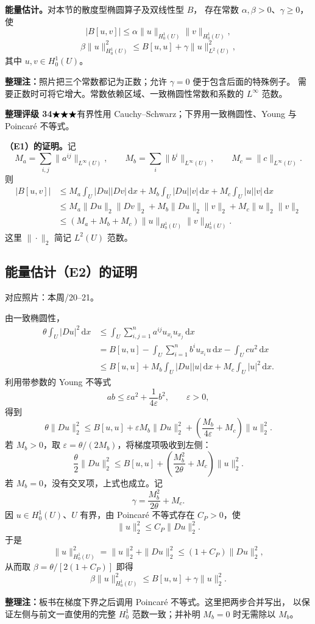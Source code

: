 \documentclass[UTF8,a4paper,11pt,fontset=fandol]{ctexart}
\newcommand{\dd}{\,\mathrm d}
\newcommand{\ednote}[1]{\par{\small\color{notegray}\textbf{整理注：}#1}\par}
\newcommand{\source}[1]{{\small\color{notegray}对应照片：#1。}\par}
\newcommand{\proofstars}[1]{\ensuremath{%
\ifnum#1>0\relax\bigstar\fi
\ifnum#1>1\relax\bigstar\fi
\ifnum#1>2\relax\bigstar\fi
\ifnum#1>3\relax\bigstar\fi
\ifnum#1>4\relax\bigstar\fi}}
\newcommand{\proofrating}[3]{\par{\small\color{proofblue}%
\textbf{整理评级 #1}\enspace\proofstars{#2}\quad #3\par}}
\begin{document}
\textbf{能量估计。}对本节的散度型椭圆算子及双线性型 $B$，
存在常数 $\alpha,\beta>0$、$\gamma\geq0$，使
\[
\boxed{|B[u,v]|\leq\alpha\|u\|_{H_0^1(U)}\|v\|_{H_0^1(U)},}
\tag{E1}
\]
\[
\boxed{\beta\|u\|_{H_0^1(U)}^2
\leq B[u,u]+\gamma\|u\|_{L^2(U)}^2,}
\tag{E2}
\]
其中 $u,v\in H_0^1(U)$。
\ednote{照片把三个常数都记为正数；允许 $\gamma=0$ 便于包含后面的特殊例子。
需要正数时可将它增大。常数依赖区域、一致椭圆性常数和系数的 $L^\infty$ 范数。}

\proofrating{34}{3}{有界性用 Cauchy--Schwarz；下界用一致椭圆性、Young 与 Poincaré 不等式。}
\textbf{（E1）的证明。}记
\[
M_a=\sum_{i,j}\|a^{ij}\|_{L^\infty(U)},\qquad
M_b=\sum_i\|b^i\|_{L^\infty(U)},\qquad
M_c=\|c\|_{L^\infty(U)}.
\]
则
\[
\begin{aligned}
|B[u,v]|&\leq M_a\int_U|Du||Dv|\dd x
 +M_b\int_U|Du||v|\dd x+M_c\int_U|u||v|\dd x\\
&\leq M_a\|Du\|_2\|Dv\|_2
 +M_b\|Du\|_2\|v\|_2+M_c\|u\|_2\|v\|_2\\
&\leq(M_a+M_b+M_c)\|u\|_{H_0^1(U)}\|v\|_{H_0^1(U)}.
\end{aligned}
\]
这里 $\|\cdot\|_2$ 简记 $L^2(U)$ 范数。

\newpage
\subsection*{能量估计（E2）的证明}
\source{本周/20--21}
由一致椭圆性，
\[
\begin{aligned}
\theta\int_U|Du|^2\dd x
&\leq\int_U\sum_{i,j=1}^na^{ij}u_{x_i}u_{x_j}\dd x\\
&=B[u,u]-\int_U\sum_{i=1}^nb^iu_{x_i}u\dd x-\int_Ucu^2\dd x\\
&\leq B[u,u]+M_b\int_U|Du||u|\dd x+M_c\int_U|u|^2\dd x.
\end{aligned}
\]
利用带参数的 Young 不等式
\[
ab\leq\varepsilon a^2+\frac{1}{4\varepsilon}b^2,\qquad\varepsilon>0,
\]
得到
\[
\theta\|Du\|_2^2
\leq B[u,u]+\varepsilon M_b\|Du\|_2^2
 +\left(\frac{M_b}{4\varepsilon}+M_c\right)\|u\|_2^2.
\]
若 $M_b>0$，取 $\varepsilon=\theta/(2M_b)$，将梯度项吸收到左侧：
\[
\frac\theta2\|Du\|_2^2
\leq B[u,u]+\left(\frac{M_b^2}{2\theta}+M_c\right)\|u\|_2^2.
\]
若 $M_b=0$，没有交叉项，上式也成立。记
\[
\gamma=\frac{M_b^2}{2\theta}+M_c.
\]
因 $u\in H_0^1(U)$、$U$ 有界，由 Poincaré 不等式存在 $C_P>0$，使
\[
\|u\|_2^2\leq C_P\|Du\|_2^2.
\]
于是
\[
\|u\|_{H_0^1(U)}^2=\|u\|_2^2+\|Du\|_2^2
\leq(1+C_P)\|Du\|_2^2,
\]
从而取 $\beta=\theta/[2(1+C_P)]$ 即得
\[
\boxed{\beta\|u\|_{H_0^1(U)}^2\leq B[u,u]+\gamma\|u\|_2^2.}
\]
\ednote{板书在梯度下界之后调用 Poincaré 不等式。这里把两步合并写出，
以保证左侧与前文一直使用的完整 $H_0^1$ 范数一致；并补明 $M_b=0$ 时无需除以 $M_b$。}
\end{document}
